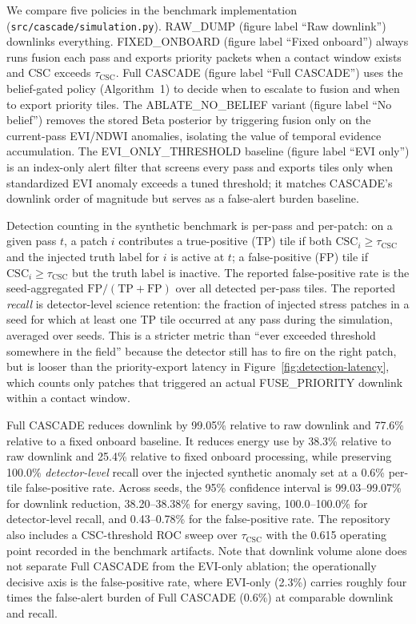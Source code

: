 \documentclass[11pt]{article}
\begin{document}
We compare five policies in the benchmark implementation (\texttt{src/cascade/simulation.py}). RAW\_DUMP (figure label ``Raw downlink'') downlinks everything. FIXED\_ONBOARD (figure label ``Fixed onboard'') always runs fusion each pass and exports priority packets when a contact window exists and CSC exceeds $\tau_\mathrm{CSC}$. Full CASCADE (figure label ``Full CASCADE'') uses the belief-gated policy (Algorithm~1) to decide when to escalate to fusion and when to export priority tiles. The ABLATE\_NO\_BELIEF variant (figure label ``No belief'') removes the stored Beta posterior by triggering fusion only on the current-pass EVI/NDWI anomalies, isolating the value of temporal evidence accumulation. The EVI\_ONLY\_THRESHOLD baseline (figure label ``EVI only'') is an index-only alert filter that screens every pass and exports tiles only when standardized EVI anomaly exceeds a tuned threshold; it matches CASCADE's downlink order of magnitude but serves as a false-alert burden baseline.

Detection counting in the synthetic benchmark is per-pass and per-patch: on a given pass $t$, a patch $i$ contributes a true-positive (TP) tile if both $\mathrm{CSC}_i\geq\tau_\mathrm{CSC}$ and the injected truth label for $i$ is active at $t$; a false-positive (FP) tile if $\mathrm{CSC}_i\geq\tau_\mathrm{CSC}$ but the truth label is inactive. The reported false-positive rate is the seed-aggregated $\mathrm{FP}/(\mathrm{TP}+\mathrm{FP})$ over all detected per-pass tiles. The reported \emph{recall} is detector-level science retention: the fraction of injected stress patches in a seed for which at least one TP tile occurred at any pass during the simulation, averaged over seeds. This is a stricter metric than ``ever exceeded threshold somewhere in the field'' because the detector still has to fire on the right patch, but is looser than the priority-export latency in Figure~\ref{fig:detection-latency}, which counts only patches that triggered an actual FUSE\_PRIORITY downlink within a contact window.

Full CASCADE reduces downlink by 99.05\% relative to raw downlink and 77.6\% relative to a fixed onboard baseline. It reduces energy use by 38.3\% relative to raw downlink and 25.4\% relative to fixed onboard processing, while preserving 100.0\% \emph{detector-level} recall over the injected synthetic anomaly set at a 0.6\% per-tile false-positive rate. Across seeds, the 95\% confidence interval is 99.03--99.07\% for downlink reduction, 38.20--38.38\% for energy saving, 100.0--100.0\% for detector-level recall, and 0.43--0.78\% for the false-positive rate. The repository also includes a CSC-threshold ROC sweep over $\tau_\mathrm{CSC}$ with the 0.615 operating point recorded in the benchmark artifacts. Note that downlink volume alone does not separate Full CASCADE from the EVI-only ablation; the operationally decisive axis is the false-positive rate, where EVI-only (2.3\%) carries roughly four times the false-alert burden of Full CASCADE (0.6\%) at comparable downlink and recall.
\end{document}
